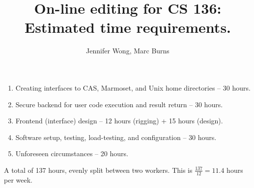 \documentclass[12pt]{paper}
\title{On-line editing for CS 136: Estimated time requirements.}
\author{Jennifer Wong, Marc Burns}
\begin{document}
  \maketitle
  \begin{enumerate}[1.]
    \item Creating interfaces to CAS, Marmoset, and Unix home directories -- 30 hours.
    \item Secure backend for user code execution and result return -- 30 hours.
    \item Frontend (interface) design -- 12 hours (rigging) + 15 hours (design).
    \item Software setup, testing, load-testing, and configuration -- 30 hours.
    \item Unforeseen circumstances -- 20 hours.
  \end{enumerate}

  A total of 137 hours, evenly split between two workers. This is $\frac{137}{12} =  11.4$ hours per week.
\end{document}
